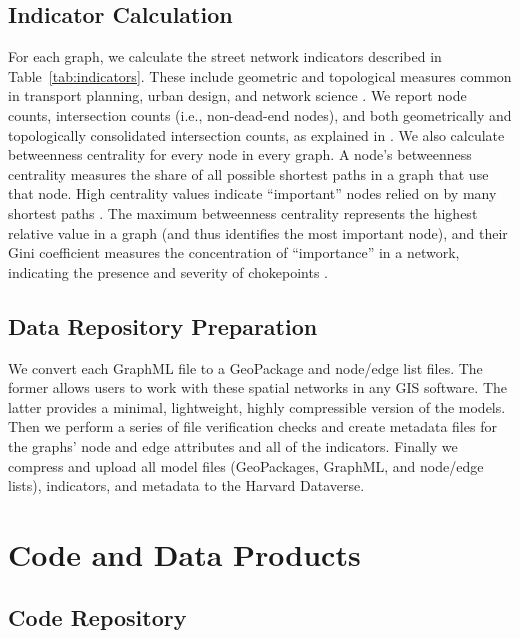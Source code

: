 \documentclass[12pt,letterpaper]{article} %
\begin{document}
\subsection{Indicator Calculation}

For each graph, we calculate the street network indicators described in Table~\ref{tab:indicators}. These include geometric and topological measures common in transport planning, urban design, and network science \citep{barthelemy_spatial_2011,barthelemy_spatial_2022,boeing_street_2022}. We report node counts, intersection counts (i.e., non-dead-end nodes), and both geometrically and topologically consolidated intersection counts, as explained in \citet{boeing_topological_2025}. We also calculate betweenness centrality for every node in every graph. A node's betweenness centrality measures the share of all possible shortest paths in a graph that use that node. High centrality values indicate \enquote{important} nodes relied on by many shortest paths \citep{boeing_urban_2024}. The maximum betweenness centrality represents the highest relative value in a graph (and thus identifies the most important node), and their Gini coefficient measures the concentration of \enquote{importance} in a network, indicating the presence and severity of chokepoints \citep{barthelemy_universal_2025}.

\subsection{Data Repository Preparation}

We convert each GraphML file to a GeoPackage and node/edge list files. The former allows users to work with these spatial networks in any GIS software. The latter provides a minimal, lightweight, highly compressible version of the models. Then we perform a series of file verification checks and create metadata files for the graphs' node and edge attributes and all of the indicators. Finally we compress and upload all model files (GeoPackages, GraphML, and node/edge lists), indicators, and metadata to the Harvard Dataverse.

\section{Code and Data Products}

\subsection{Code Repository}
\end{document}
